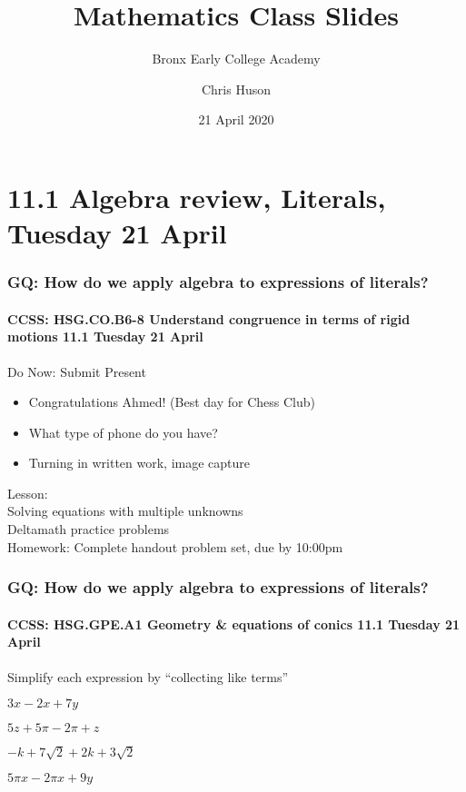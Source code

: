 \documentclass{beamer}
\title{Mathematics Class Slides}
\subtitle{Bronx Early College Academy}
\author{Chris Huson}
\date{21 April 2020}
\begin{document}
\frame{\titlepage}
\section[Outline]{}
\frame{\tableofcontents}

\section{11.1 Algebra review, Literals, Tuesday 21 April} 
\frame
{
  \frametitle{GQ: How do we apply algebra to expressions of literals?}
  \framesubtitle{CCSS: HSG.CO.B6-8 Understand congruence in terms of rigid motions \hfill \alert{11.1 Tuesday 21 April}}

  \begin{block}{Do Now: Submit Present}
    \begin{itemize}
      \item Congratulations Ahmed! (Best day for Chess Club)
      \item What type of phone do you have? 
      \item Turning in written work, image capture
    \end{itemize}

    \end{block}
    Lesson: \\
    Solving equations with multiple unknowns\\
    Deltamath practice problems  \\
    Homework: Complete handout problem set, due by 10:00pm
}

\frame
{
  \frametitle{GQ: How do we apply algebra to expressions of literals?}
  \framesubtitle{CCSS: HSG.GPE.A1 Geometry \& equations of conics \hfill \alert{11.1 Tuesday 21 April}}

  Simplify each expression by ``collecting like terms''
  
  \begin{enumerate}%
    \begin{multicols}{2}
      \item $3x-2x+7y$ \vspace{2cm}
      \item $5z+5\pi-2\pi+z$
      \item $-k+7\sqrt{2}+2k+3\sqrt{2}$ \vspace{2cm}
      \item $5\pi x-2 \pi x +9y$
    \end{multicols}
    \end{enumerate} \vspace{2cm}
}
\end{document}
